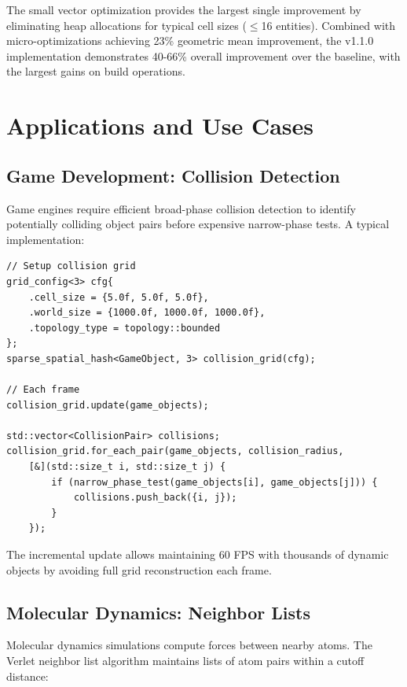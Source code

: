 \documentclass[11pt]{article}
\begin{document}
The small vector optimization provides the largest single improvement by eliminating heap allocations for typical cell sizes ($\leq$16 entities). Combined with micro-optimizations achieving 23\% geometric mean improvement, the v1.1.0 implementation demonstrates 40-66\% overall improvement over the baseline, with the largest gains on build operations.

\section{Applications and Use Cases}

\subsection{Game Development: Collision Detection}

Game engines require efficient broad-phase collision detection to identify potentially colliding object pairs before expensive narrow-phase tests. A typical implementation:

\begin{lstlisting}[caption={Game collision detection example}]
// Setup collision grid
grid_config<3> cfg{
    .cell_size = {5.0f, 5.0f, 5.0f},
    .world_size = {1000.0f, 1000.0f, 1000.0f},
    .topology_type = topology::bounded
};
sparse_spatial_hash<GameObject, 3> collision_grid(cfg);

// Each frame
collision_grid.update(game_objects);

std::vector<CollisionPair> collisions;
collision_grid.for_each_pair(game_objects, collision_radius,
    [&](std::size_t i, std::size_t j) {
        if (narrow_phase_test(game_objects[i], game_objects[j])) {
            collisions.push_back({i, j});
        }
    });
\end{lstlisting}

The incremental update allows maintaining 60 FPS with thousands of dynamic objects by avoiding full grid reconstruction each frame.

\subsection{Molecular Dynamics: Neighbor Lists}

Molecular dynamics simulations compute forces between nearby atoms. The Verlet neighbor list algorithm maintains lists of atom pairs within a cutoff distance:
\end{document}
